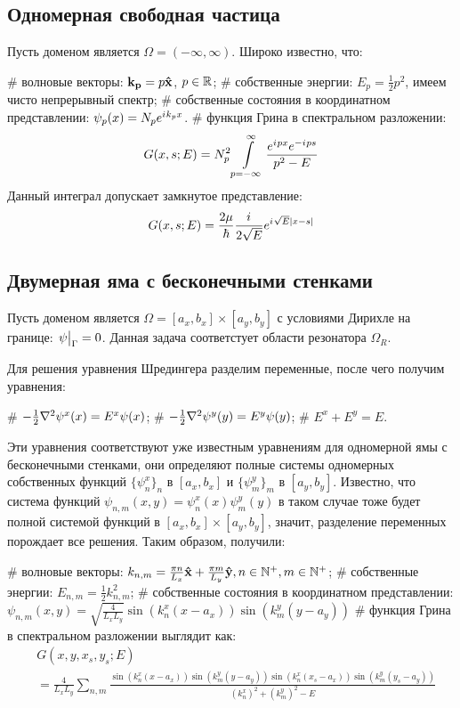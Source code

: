 \subsection{Одномерная свободная частица}
Пусть доменом является $\Omega = (-\infty, \infty)$. Широко известно, что:
\begin{ilist}
# волновые векторы: $\vb{k_{p}} = p \vb{\hat{x}}$, $p \in \mathbb{R}$;
# собственные энергии: $E_p = \frac{1}{2} p^2$, имеем чисто непрерывный спектр;
# собственные состояния в координатном представлении: $\psi_p(x) = N_p e^{{i\mkern1mu} k_p x}$. 
# функция Грина в спектральном разложении:
\[
G(x, s; E) = N_p^2 \int\limits_{p = -\infty}^\infty \frac{e^{{i\mkern1mu} p x} e^{-{i\mkern1mu} p s}}{p^2 - E}
\]
Данный интеграл допускает замкнутое представление:
\[
G(x, s; E) = \frac{2 \mu}{\hbar} \frac{{i\mkern1mu}}{2 \sqrt{E}} e^{{i\mkern1mu} \sqrt{E} |x - s|}
\]
\end{ilist}

\subsection{Двумерная яма с бесконечными стенками}
Пусть доменом является $\Omega = [a_x, b_x] \times [a_y, b_y]$ с условиями Дирихле на границе: $\eval{\psi}_{\Gamma} = 0$. Данная задача соответстует области резонатора $\Omega_R$.

Для решения уравнения Шредингера разделим переменные, после чего получим уравнения:
\begin{ilist}
# $-\frac{1}{2} \laplacian \psi^x(x) = E^x \psi(x)$;
# $-\frac{1}{2} \laplacian \psi^y(y) = E^y \psi(y)$;
# $E^x + E^y = E$.
\end{ilist}
Эти уравнения соответствуют уже известным уравнениям для одномерной ямы с бесконечными стенками, они определяют полные системы одномерных собственных функций $\{\psi^x_n\}_n$ в $[a_x, b_x]$ и $\{\psi^y_m\}_m$ в $[a_y, b_y]$. Известно, что система функций $\psi_{n, m}(x, y) = \psi_n^x(x) \psi_m^y(y)$ в таком случае тоже будет полной системой функций в $[a_x, b_x] \times [a_y, b_y]$, значит, разделение переменных порождает все решения. Таким образом, получили:

\begin{ilist}
# волновые векторы: $k_{n, m} = \frac{\pi n}{L_x} \vb{\hat{x}} + \frac{\pi m}{L_y} \vb{\hat{y}}, n \in \mathbb{N}^+, m \in \mathbb{N}^+$;
# собственные энергии: $E_{n, m} = \frac{1}{2} k_{n, m}^2$;
# собственные состояния в координатном представлении: $\psi_{n, m}(x, y) = \sqrt{\frac{4}{L_x L_y}} \sin(k^x_n (x - a_x)) \sin(k^y_m (y - a_y))$
# функция Грина в спектральном разложении выглядит как:
\begin{align*}
& G(x, y, x_s, y_s; E) \\
& = \frac{4}{L_x L_y} \sum\limits_{n, m} \frac{\sin(k^x_n (x - a_x)) \sin(k^y_m (y - a_y)) \sin(k^x_n (x_s - a_x)) \sin(k^y_m (y_s - a_y))}{(k_n^x)^2 + (k_m^y)^2 - E}
\end{align*}
\end{ilist}

